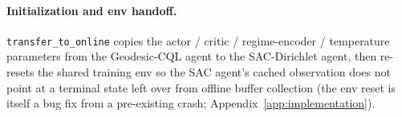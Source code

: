 \paragraph{Initialization and env handoff.} \texttt{transfer\_to\_online}
copies the actor / critic / regime-encoder / temperature parameters from
the Geodesic-CQL agent to the SAC-Dirichlet agent, then re-resets the
shared training env so the SAC agent's cached observation does not point
at a terminal state left over from offline buffer collection (the env
reset is itself a bug fix from a pre-existing crash;
Appendix~\ref{app:implementation}).


